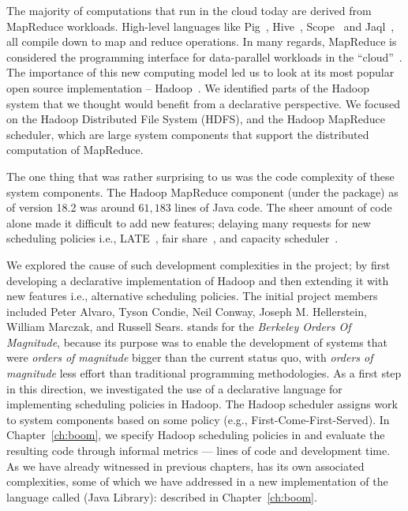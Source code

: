 The majority of computations that run in the cloud today are derived from
MapReduce workloads.  High-level languages like Pig~\cite{pig-sigmod},
Hive~\cite{hive-vldb}, Scope~\cite{scope} and Jaql~\cite{jaql}, all compile
down to map and reduce operations.  In many regards, MapReduce is considered
the programming interface for data-parallel workloads in the
``cloud''~\cite{abovetheclouds}.  The importance of this new computing model
led us to look at its most popular open source implementation --
Hadoop~\cite{hadoop}.  We identified parts of the Hadoop system that we thought
would benefit from a declarative perspective.  We focused on the Hadoop
Distributed File System (HDFS), and the Hadoop MapReduce scheduler, which are
large system components that support the distributed computation of MapReduce.

The one thing that was rather surprising to us was the code complexity of these
system components.  The Hadoop MapReduce component (under the
 package) as of version 18.2 was around $61,183$
lines of Java code.  The sheer amount of code alone made it difficult to add
new features; delaying many requests for new scheduling policies i.e.,
LATE~\cite{zaharia-late}, fair share~\cite{jira-3746}, and capacity
scheduler~\cite{jira-3445}.


We explored the cause of such development complexities in the \BOOM project; by
first developing a declarative implementation of Hadoop and then extending it
with new features i.e., alternative scheduling policies.  The initial project
members included Peter Alvaro, Tyson Condie, Neil Conway, Joseph M.
Hellerstein, William Marczak, and Russell Sears.  \BOOM stands for the {\em
Berkeley Orders Of Magnitude}, because its purpose was to enable the
development of systems that were {\em orders of magnitude} bigger than the
current status quo, with {\em orders of magnitude} less effort than traditional
programming methodologies.  As a first step in this direction, we investigated
the use of a declarative language for implementing scheduling policies in
Hadoop.  The Hadoop scheduler assigns work to system components based on some
policy (e.g., First-Come-First-Served).  In Chapter~\ref{ch:boom}, we specify
Hadoop scheduling policies in \OVERLOG and evaluate the resulting code through
informal metrics --- lines of code and development time.  As we have already
witnessed in previous chapters, \OVERLOG has its own associated complexities,
some of which we have addressed in a new implementation of the language called
\JOL (Java \OVERLOG Library): described in Chapter~\ref{ch:boom}.

